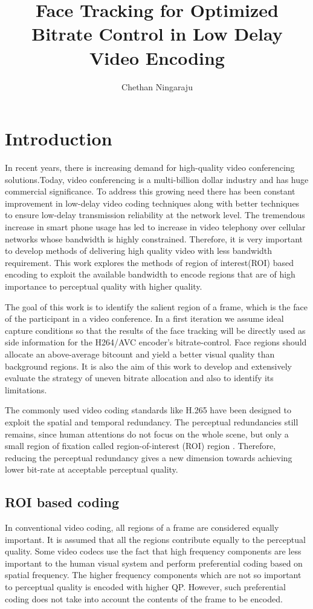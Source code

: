 \documentclass[11pt]{article} %
\title{Face Tracking for Optimized Bitrate Control in Low Delay Video Encoding}
\author{Chethan Ningaraju}
\begin{document}
\maketitle
\clearpage
\tableofcontents
\clearpage
\section{Introduction}
	In recent years, there is increasing demand for high-quality video conferencing solutions.Today, video conferencing is a multi-billion dollar industry and has huge commercial significance. To address this growing need there has been constant improvement in  low-delay video coding techniques along with better techniques to ensure low-delay transmission reliability at the network level. The tremendous increase in smart phone usage has led to increase in video telephony over cellular networks whose bandwidth is highly constrained. Therefore, it is very important to develop methods of delivering high quality video with less bandwidth requirement. This work explores the methods of region of interest(ROI) based encoding to exploit the available bandwidth to encode regions that are of high importance to perceptual quality with higher quality. 

The goal of this work is to identify the salient region of a frame, which is the face of the participant in a video conference. In a first iteration we assume ideal capture conditions so that the results of the face tracking will be directly used as side information for the H264/AVC encoder's bitrate-control. Face regions should allocate an above-average bitcount and yield a better visual quality than background regions. It is also the aim of this work to develop and extensively evaluate the strategy of uneven bitrate allocation and also to identify its limitations.

The commonly used video coding standards like H.265 have been designed to exploit the spatial and temporal redundancy. The perceptual redundancies still remains, since human attentions do not focus on the whole scene, but only a small region of fixation called region-of-interest (ROI) region \cite{Perception-model-of-face}. Therefore, reducing the perceptual redundancy gives a new dimension towards achieving lower bit-rate at acceptable perceptual quality. 

\subsection{ROI based coding}
	In conventional video coding, all regions of a frame are considered equally important. It is assumed that all the regions contribute equally to the perceptual quality. Some video codecs use the fact that high frequency components are less important to the human visual system and perform preferential coding based on spatial frequency. The higher frequency components which are not so important to perceptual quality is encoded with higher QP. However, such preferential coding does not take into account the contents of the frame to be encoded. 
\end{document}
